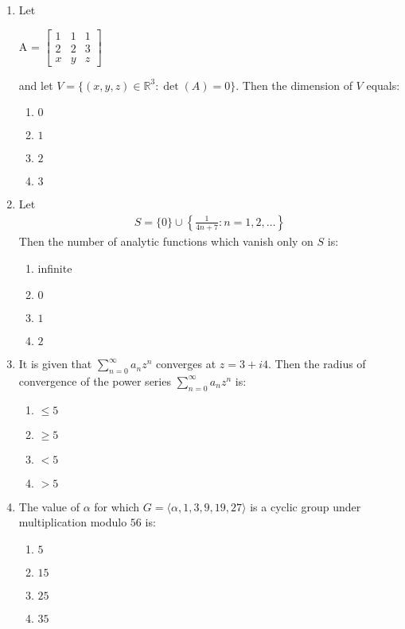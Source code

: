 \documentclass[journal]{IEEEtran}
\newcommand{\myvec}[1]{\begin{bmatrix}#1\end{bmatrix}}
\numberwithin{equation}{enumi}
\numberwithin{figure}{enumi}
\begin{document}
\begin{enumerate}
\item Let             \hfill{}

A = $\myvec{
1 & 1 & 1 \\
2 & 2 & 3 \\
x & y & z}$

and let $V = \{(x, y, z) \in \mathbb{R}^3 : \det(A) = 0\}$. Then the dimension of $V$ equals:

\begin{multicols}{4}
\begin{enumerate}
    \item $0$
    \item $1$
    \item $2$
    \item $3$
\end{enumerate}
\end{multicols}


 
\item Let  \hfill{}
\begin{align*}
 S = \{0\} \cup \left\{ \frac{1}{4n + 7} : n = 1, 2, \ldots \right\}   
\end{align*} 
Then the number of analytic functions which vanish only on $S$ is:   
\begin{multicols}{4}
\begin{enumerate}
    \item infinite
    \item $0$
    \item $1$
    \item $2$
\end{enumerate}
\end{multicols}
 

\item It is given that $\sum_{n=0}^\infty a_n z^n$ converges at $z = 3 + i4$. Then the radius of convergence of the power series $\sum_{n=0}^\infty a_n z^n$ is:   \hfill{}
\begin{multicols}{4}
\begin{enumerate}
    \item $\leq 5 $
    \item $\geq 5$
    \item $< 5$
    \item $> 5$
\end{enumerate}
\end{multicols}


\item The value of $\alpha$ for which $G = \langle \alpha, 1, 3, 9, 19, 27 \rangle$ is a cyclic group under multiplication modulo $56$ is:      \hfill{}
\begin{multicols}{4}
\begin{enumerate}
    \item $5 $
    \item $15$
    \item $25$
    \item $35$
\end{enumerate}
\end{multicols}




\end{enumerate}
\end{document}
